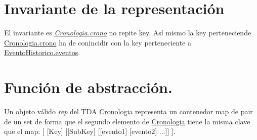 \hypertarget{repCronologia_invCronologia}{}\section{Invariante de la representación}\label{repCronologia_invCronologia}
El invariante es {\itshape \hyperlink{classCronologia_a5ba99beab3de21fd9c1c4c3555839d76}{Cronologia.\+crono}} no repite key. Así mismo la key perteneciende \hyperlink{classCronologia_a5ba99beab3de21fd9c1c4c3555839d76}{Cronologia.\+crono} ha de conincidir con la key perteneciente a \hyperlink{classEventoHistorico_a6abe942b12ab22f551062d7ee9e9e02d}{Evento\+Historico.\+eventos}.\hypertarget{repCronologia_faCronologia}{}\section{Función de abstracción.}\label{repCronologia_faCronologia}
Un objeto válido {\itshape rep} del T\+DA \hyperlink{classCronologia}{Cronologia} representa un contenedor map de pair de un set de forma que el segundo elemento de \hyperlink{classCronologia}{Cronologia} tiene la misma clave que el map\+: \mbox{[} \mbox{[}Key\mbox{]} \mbox{[}\mbox{[}Sub\+Key\mbox{]} \mbox{[}\mbox{[}evento1\mbox{]} \mbox{[}evento2\mbox{]} ...\mbox{]}\mbox{]} \mbox{]}. 